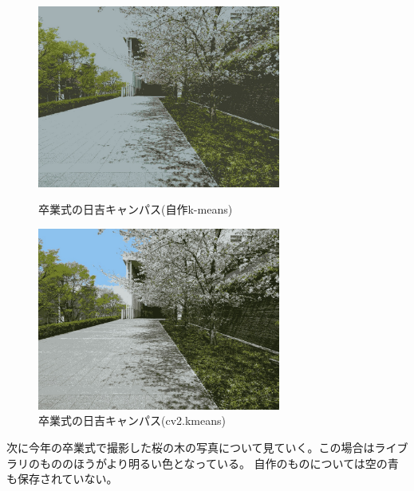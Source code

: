 \documentclass[11pt,a4j]{jsarticle}
\begin{document}
    \begin{figure}[htbp]
        \begin{minipage}{0.5\hsize}
         \begin{center}
          \includegraphics[width=80mm]{img/sakura_result.jpg}
         \end{center}
         \caption{卒業式の日吉キャンパス(自作k-means)}
        \end{minipage}
        \begin{minipage}{0.5\hsize}
         \begin{center}
          \includegraphics[width=80mm]{img/sakura_opencv.jpg}
         \end{center}
         \caption{卒業式の日吉キャンパス(cv2.kmeans)}
        \end{minipage}
    \end{figure} 
    次に今年の卒業式で撮影した桜の木の写真について見ていく。この場合はライブラリのもののほうがより明るい色となっている。
    自作のものについては空の青も保存されていない。
\end{document}
